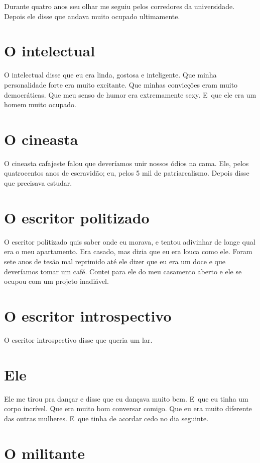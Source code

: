 Durante quatro anos seu olhar me seguiu pelos corredores da
universidade. Depois ele disse que andava muito ocupado ultimamente.

\chapter{O intelectual}

O intelectual disse que eu era linda, gostosa e inteligente. Que minha
personalidade forte era muito excitante. Que minhas convicções eram
muito democráticas. Que meu senso de humor era extremamente sexy. E~que
ele era um homem muito ocupado.

\chapter{O cineasta}

O cineasta cafajeste falou que deveríamos unir nossos ódios na cama.
Ele, pelos quatrocentos anos de escravidão; eu, pelos 5 mil de
patriarcalismo. Depois disse que precisava estudar.

\chapter{O escritor politizado}

O escritor politizado quis saber onde eu morava, e tentou adivinhar de
longe qual era o meu apartamento. Era casado, mas dizia que eu era
louca como ele. Foram sete anos de tesão mal reprimido até ele dizer que
eu era um doce e que deveríamos tomar um café. Contei para ele do meu
casamento aberto e ele se ocupou com um projeto inadiável.

\chapter{O escritor introspectivo}

O escritor introspectivo disse que queria um lar.

\chapter{Ele}

Ele me tirou pra dançar e disse que eu dançava muito bem. E~que eu tinha
um corpo incrível. Que era muito bom conversar comigo. Que eu era muito
diferente das outras mulheres. E~que tinha de acordar cedo no dia
seguinte.

\chapter{O militante}

